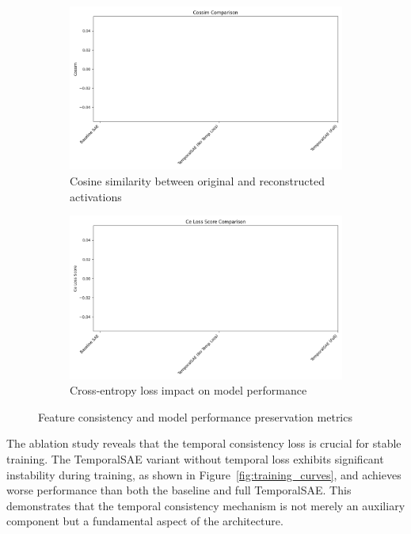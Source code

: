 \documentclass{article} %
\begin{document}
\begin{figure}[h]
    \centering
    \begin{subfigure}{0.49\textwidth}
        \includegraphics[width=\textwidth]{cossim_comparison.png}
        \caption{Cosine similarity between original and reconstructed activations}
        \label{fig:cossim}
    \end{subfigure}
    \hfill
    \begin{subfigure}{0.49\textwidth}
        \includegraphics[width=\textwidth]{ce_loss_score_comparison.png}
        \caption{Cross-entropy loss impact on model performance}
        \label{fig:ce_loss}
    \end{subfigure}
    \caption{Feature consistency and model performance preservation metrics}
    \label{fig:consistency_results}
\end{figure}

The ablation study reveals that the temporal consistency loss is crucial for stable training. The TemporalSAE variant without temporal loss exhibits significant instability during training, as shown in Figure~\ref{fig:training_curves}, and achieves worse performance than both the baseline and full TemporalSAE. This demonstrates that the temporal consistency mechanism is not merely an auxiliary component but a fundamental aspect of the architecture.
\end{document}
